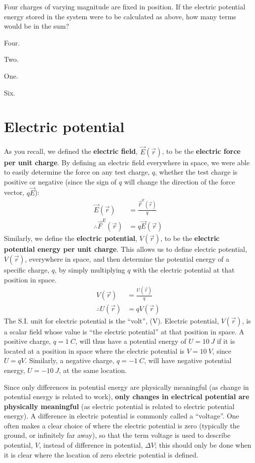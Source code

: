 \begin{checkpoint}
	\begin{MCquestion}{Four charges of varying magnitude are fixed in position. If the electric potential energy stored in the system were to be calculated as above, how many terms would be in the sum?}
		\item Four.
		\item Two.
		\item One.
		\item Six. \correct
	\end{MCquestion}
\end{checkpoint}


\section{Electric potential}
As you recall, we defined the \textbf{electric field}, $\vec E(\vec r)$, to be the \textbf{electric force per unit charge}. By defining an electric field everywhere in space, we were able to easily determine the force on any test charge, $q$, whether the test charge is positive or negative (since the sign of $q$ will change the direction of the force vector, $q\vec E$):
\begin{align*}
\vec E(\vec r) &= \frac{\vec F^E(\vec r)}{q}\\
\therefore \vec F^E(\vec r)&=q\vec E(\vec r)
\end{align*}
Similarly, we define the \textbf{electric potential}, $V(\vec r)$, to be the \textbf{electric potential energy per unit charge}. This allows us to define electric potential, $V(\vec r)$, everywhere in space, and then determine the potential energy of a specific charge, $q$, by simply multiplying $q$ with the electric potential at that position in space.
\begin{align*}
V(\vec r) &= \frac{ U(\vec r)}{q}\\
\therefore U(\vec r)&= q V(\vec r)
\end{align*}
The S.I. unit for electric potential is the ``volt'', (V). Electric potential, $V(\vec r)$, is a scalar field whose value is ``the electric potential'' at that position in space. A positive charge, $q=\SI{1}{C}$, will thus have a potential energy of $U=\SI{10}{J}$ if it is located at a position in space where the electric potential is $V=\SI{10}{V}$, since $U=qV$. Similarly, a negative charge, $q=\SI{-1}{C}$, will have negative potential energy, $U=\SI{-10}{J}$, at the same location.

Since only differences in potential energy are physically meaningful (as change in potential energy is related to work), \textbf{only changes in electrical potential are physically meaningful} (as electric potential is related to electric potential energy). A difference in electric potential is commonly called a ``voltage''. One often makes a clear choice of where the electric potential is zero (typically the ground, or infinitely far away), so that the term voltage is used to describe potential, $V$, instead of difference in potential, $\Delta V$; this should only be done when it is clear where the location of zero electric potential is defined.

